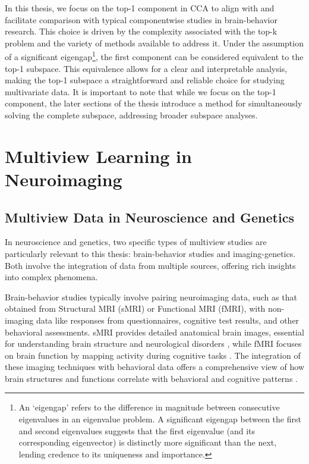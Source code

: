 In this thesis, we focus on the top-1 component in CCA to align with and facilitate comparison with typical componentwise studies in brain-behavior research.
This choice is driven by the complexity associated with the top-k problem and the variety of methods available to address it.
Under the assumption of a significant eigengap\footnote{An `eigengap' refers to the difference in magnitude between consecutive eigenvalues in an eigenvalue problem. A significant eigengap between the first and second eigenvalues suggests that the first eigenvalue (and its corresponding eigenvector) is distinctly more significant than the next, lending credence to its uniqueness and importance.}, the first component can be considered equivalent to the top-1 subspace.
This equivalence allows for a clear and interpretable analysis, making the top-1 subspace a straightforward and reliable choice for studying multivariate data.
It is important to note that while we focus on the top-1 component, the later sections of the thesis introduce a method for simultaneously solving the complete subspace, addressing broader subspace analyses.


\section{Multiview Learning in Neuroimaging}

\subsection{Multiview Data in Neuroscience and Genetics}

In neuroscience and genetics, two specific types of multiview studies are particularly relevant to this thesis: brain-behavior studies and imaging-genetics.
Both involve the integration of data from multiple sources, offering rich insights into complex phenomena.

Brain-behavior studies typically involve pairing neuroimaging data, such as that obtained from Structural MRI (sMRI) or Functional MRI (fMRI), with non-imaging data like responses from questionnaires, cognitive test results, and other behavioral assessments.
sMRI provides detailed anatomical brain images, essential for understanding brain structure and neurological disorders \citep{kanai2011structural}, while fMRI focuses on brain function by mapping activity during cognitive tasks \citep{miranda2021systematic}.
The integration of these imaging techniques with behavioral data offers a comprehensive view of how brain structures and functions correlate with behavioral and cognitive patterns \citep{rypma2001age,genon2022linking}.

